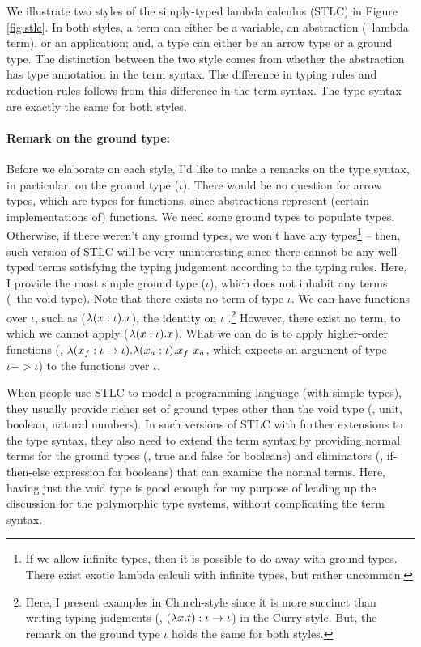 We illustrate two styles of the simply-typed lambda calculus (STLC)
in Figure \ref{fig:stlc}. In both styles, a term can either be a variable,
an abstraction (\aka\ lambda term), or an application; and, a type can
either be an arrow type or a ground type. The distinction between
the two style comes from whether the abstraction has type annotation
in the term syntax. The difference in typing rules and reduction rules
follows from this difference in the term syntax. The type syntax are
exactly the same for both styles.

\paragraph{Remark on the ground type:}
Before we elaborate on each style, I'd like to make a remarks on 
the type syntax, in particular, on the ground type ($\iota$).
There would be no question for arrow types, which are types for functions,
since abstractions represent (certain implementations of) functions.
We need some ground types to populate types. Otherwise, if there weren't
any ground types, we won't have any types\footnote{If we allow infinite
types, then it is possible to do away with ground types. There exist
exotic lambda calculi with infinite types, but rather uncommon.}
-- then, such version of STLC will be very uninteresting since there cannot
be any well-typed terms satisfying the typing judgement according to
the typing rules. Here, I provide the most simple ground type ($\iota$),
which does not inhabit any terms (\aka\ the void type). Note that there
exists no term of type $\iota$. We can have functions over $\iota$,
such as ($\lambda(x:\iota).x$), the identity on $\iota$ .\footnote{Here,
	I present examples in Church-style since it is more succinct than
	writing typing judgments (\eg, $(\lambda x.t) : \iota -> \iota$)
	in the Curry-style.  But, the remark on the ground type $\iota$
	holds the same for both styles.}
However, there exist no term, to which we cannot apply ($\lambda(x:\iota).x$).
What we can do is to apply higher-order functions
(\eg, $\lambda(x_{f}:\iota -> \iota).\lambda(x_a:\iota).x_f~x_a$, which expects
an argument of type $\iota -> \iota$) to the functions over $\iota$.

When people use STLC to model a programming language (with simple types),
they usually provide richer set of ground types other than the void type
(\eg, unit, boolean, natural numbers). In such versions of STLC with further
extensions to the type syntax, they also need to extend the term syntax
by providing normal terms for the ground types (\eg, \textsf{true} and
\textsf{false} for booleans) and eliminators (\eg, if-then-else expression for
booleans) that can examine the normal terms. Here, having just the void type
is good enough for my purpose of leading up the discussion for
the polymorphic type systems, without complicating the term syntax.

